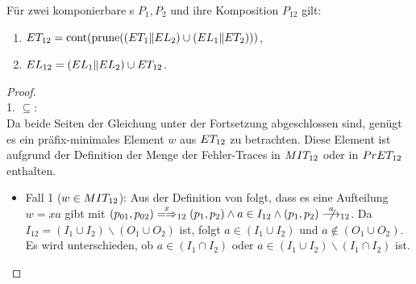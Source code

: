 \begin{Satz}
  \label{KommFehlerSemSatz}
  Für zwei komponierbare \MEIO{}s $P_1,P_2$ und ihre Komposition $P_{12}$ gilt:
  \begin{enumerate}
    \item $ET _{12} = \mathrm{cont} (\mathrm{prune} ((ET _1\|EL _2) \cup (EL _1\|ET
      _2)))$,
    \item $EL _{12} = (EL _1\|EL _2) \cup ET _{12}$.
  \end{enumerate}
\end{Satz}
\begin{proof}\mbox{}\\
  1. \glqq$\subseteq$\grqq{}:\\
  Da beide Seiten der Gleichung unter der Fortsetzung \cont{} abgeschlossen
  sind, genügt es ein präfix-minimales Element $w$ aus $ET _{12}$ zu
  betrachten. Diese Element ist aufgrund der Definition der Menge der
  Fehler-Traces in $MIT _{12}$ oder in $PrET _{12}$ enthalten.
  \begin{itemize}
    \item Fall 1 ($w\in MIT _{12}$): Aus der Definition von \MIT{} folgt, dass
      es eine Aufteilung $w=xa$ gibt mit $(p_{01},p_{02}) \weakmay[x]_{12}
      (p_1,p_2) \land a \in I_{12} \land (p_1,p_2) \nmust[a]_{12}$. Da $I_{12}
      = (I_1\cup I_2) \backslash (O_1\cup O_2)$ ist, folgt $a\in (I_1\cup I_2)$
      und $a\notin (O_1\cup O_2)$. Es wird unterschieden, ob $a\in (I_1\cap
      I_2)$ oder $a\in (I_1\cup I_2) \backslash (I_1\cap I_2)$ ist.
\end{itemize}
\end{proof}
